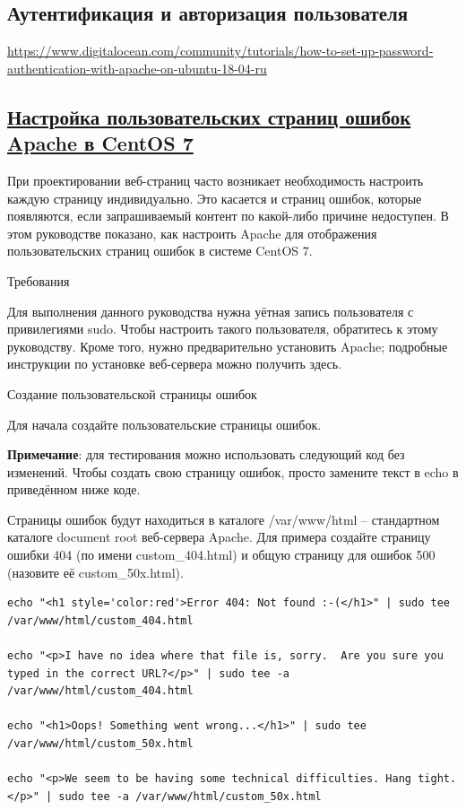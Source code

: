 \documentclass[14pt, a4paper]{article}
\begin{document}
\subsection*{Аутентификация и авторизация пользователя}

\href{https://www.digitalocean.com/community/tutorials/how-to-set-up-password-authentication-with-apache-on-ubuntu-18-04-ru}
{https://www.digitalocean.com/community/tutorials/how-to-set-up-password-authentication-with-apache-on-ubuntu-18-04-ru}




\subsection*{\href{https://www.8host.com/blog/nastrojka-polzovatelskix-stranic-oshibok-apache-v-centos-7/}
{Настройка пользовательских страниц ошибок Apache в CentOS 7}}

При проектировании веб-страниц часто возникает необходимость настроить каждую страницу индивидуально. 
Это касается и страниц ошибок, которые появляются, если запрашиваемый контент по какой-либо причине 
недоступен. В этом руководстве показано, как настроить Apache для отображения пользовательских страниц 
ошибок в системе CentOS 7.

Требования

Для выполнения данного руководства нужна уётная запись пользователя с привилегиями sudo. 
Чтобы настроить такого пользователя, обратитесь к этому руководству. Кроме того, нужно предварительно 
установить Apache; подробные инструкции по установке веб-сервера можно получить здесь.


Создание пользовательской страницы ошибок

Для начала создайте пользовательские страницы ошибок.

\textbf{Примечание}: для тестирования можно использовать следующий код без изменений. Чтобы 
создать свою страницу ошибок, просто замените текст в echo в приведённом ниже коде.

Страницы ошибок будут находиться в каталоге /var/www/html – стандартном каталоге document root 
веб-сервера Apache. Для примера создайте страницу ошибки 404 (по имени custom\_404.html) и общую страницу 
для ошибок 500 (назовите её custom\_50x.html).\newpage

\begin{lstlisting}
echo "<h1 style='color:red'>Error 404: Not found :-(</h1>" | sudo tee /var/www/html/custom_404.html

echo "<p>I have no idea where that file is, sorry.  Are you sure you typed in the correct URL?</p>" | sudo tee -a /var/www/html/custom_404.html

echo "<h1>Oops! Something went wrong...</h1>" | sudo tee /var/www/html/custom_50x.html

echo "<p>We seem to be having some technical difficulties. Hang tight.</p>" | sudo tee -a /var/www/html/custom_50x.html
\end{lstlisting}
\end{document}
